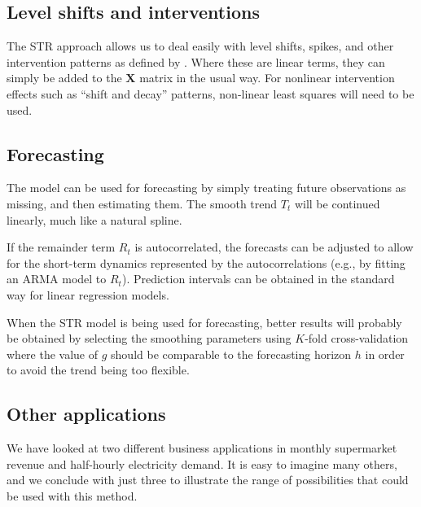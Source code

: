 \documentclass[11pt,a4paper,]{article}
\begin{document}
\hypertarget{level-shifts-and-interventions}{%
\subsection{Level shifts and interventions}\label{level-shifts-and-interventions}}

The STR approach allows us to deal easily with level shifts, spikes, and other intervention patterns as defined by \textcite{BoxTiao1975}. Where these are linear terms, they can simply be added to the \(\bm{X}\) matrix in the usual way. For nonlinear intervention effects such as ``shift and decay'' patterns, non-linear least squares will need to be used.

\hypertarget{forecasting}{%
\subsection{Forecasting}\label{forecasting}}

The model can be used for forecasting by simply treating future observations as missing, and then estimating them. The smooth trend \(T_t\) will be continued linearly, much like a natural spline.

If the remainder term \(R_t\) is autocorrelated, the forecasts can be adjusted to allow for the short-term dynamics represented by the autocorrelations (e.g., by fitting an ARMA model to \(R_t\)). Prediction intervals can be obtained in the standard way for linear regression models.

When the STR model is being used for forecasting, better results will probably be obtained by selecting the smoothing parameters using \(K\)-fold cross-validation where the value of \(g\) should be comparable to the forecasting horizon \(h\) in order to avoid the trend being too flexible.

\hypertarget{other-applications}{%
\subsection{Other applications}\label{other-applications}}

We have looked at two different business applications in monthly supermarket revenue and half-hourly electricity demand. It is easy to imagine many others, and we conclude with just three to illustrate the range of possibilities that could be used with this method.
\end{document}

